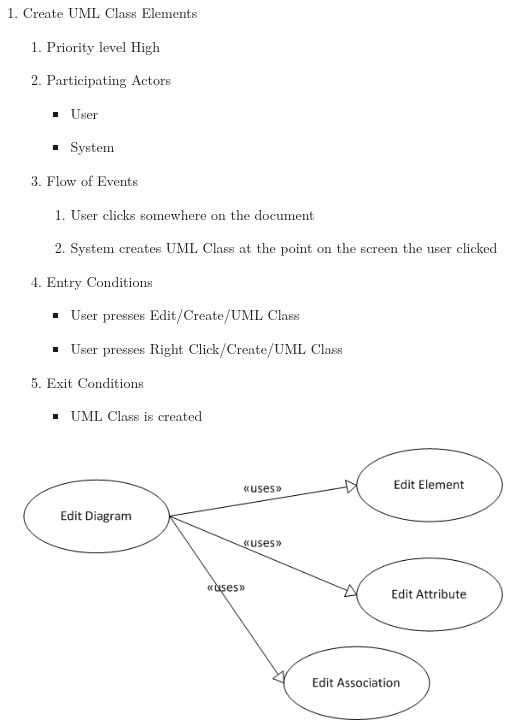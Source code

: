 \documentclass[a4paper, 12pt]{article}
\begin{document}
\begin{enumerate}
\item Create UML Class Elements
  \begin {enumerate}
  \item Priority level High
  \item Participating Actors
    \begin{itemize}
    \item User
    \item System
    \end {itemize}
  \item Flow of Events
    \begin {enumerate}
    \item User clicks somewhere on the document
    \item System creates UML Class at the point on the screen the user clicked
    \end {enumerate}
  \item Entry Conditions
    \begin {itemize}
    \item User presses Edit/Create/UML Class
    \item User presses Right Click/Create/UML Class
    \end {itemize}
  \item Exit Conditions
    \begin {itemize}
    \item UML Class is created
    \end {itemize}
  \end {enumerate}

  \begin{center}
    \includegraphics[height=3in, width=5in]{img/EditDiagram.png}
  \end{center}


\end{enumerate}
\end{document}
